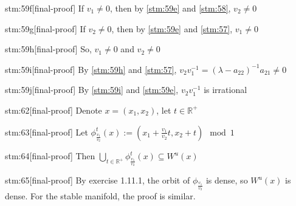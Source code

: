 \begin{stm}{stm:59f}[final-proof]
If $v_1 \ne 0$, then by \ref{stm:59e} and \ref{stm:58}, $v_2 \ne 0$
\end{stm}

\begin{stm}{stm:59g}[final-proof]
If $v_2 \ne 0$, then by \ref{stm:59e} and \ref{stm:57}, $v_1 \ne 0$
\end{stm}

\begin{stm}{stm:59h}[final-proof]
So, $v_1 \ne 0$ and $v_2 \ne 0$
\end{stm}

\begin{stm}{stm:59i}[final-proof]
By \ref{stm:59h} and \ref{stm:57}, $v_2 v_1^{-1} = (\lambda - a_{22})^{-1} a_{21} \ne 0$
\end{stm}

\begin{stm}{stm:59j}[final-proof]
By \ref{stm:59i} and \ref{stm:59e}, $v_2 v_1^{-1}$ is irrational
\end{stm}

\begin{stm}{stm:62}[final-proof]
Denote $x = (x_1, x_2)$, let $t \in \mathbb{R}^+$
\end{stm}

\begin{stm}{stm:63}[final-proof]
Let $\phi_{\frac{v_1}{v_2}}^t(x) := (x_1 + \frac{v_1}{v_2} t, x_2 + t) \mod 1$
\end{stm}

\begin{stm}{stm:64}[final-proof]
Then $\bigcup_{t \in \mathbb{R}^+} \phi_{\frac{v_1}{v_2}}^t(x) \subseteq W^u(x)$
\end{stm}

\begin{stm}{stm:65}[final-proof]
By exercise 1.11.1, the orbit of $\phi_{\frac{v_1}{v_2}}$ is dense, so $W^u(x)$ is dense. For the stable manifold, the proof is similar.
\end{stm}
